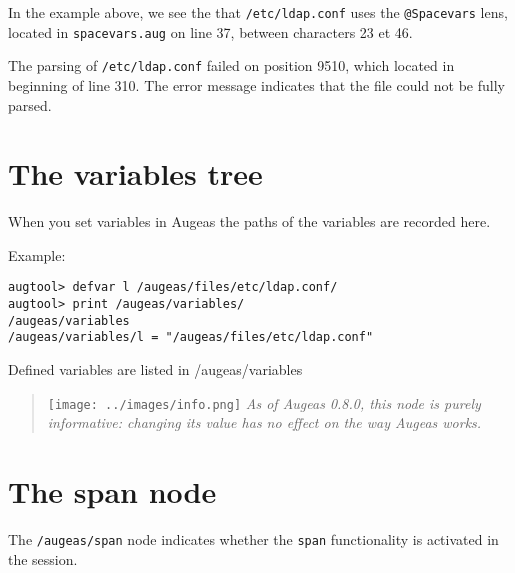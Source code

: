 In the example above, we see the that \verb!/etc/ldap.conf! uses the \verb!@Spacevars! lens, located in \verb!spacevars.aug! on line 37, between characters 23 et 46.

The parsing of \verb!/etc/ldap.conf! failed on position 9510, which located in beginning of line 310. The error message indicates that the file could not be fully parsed.


\section{The variables tree}

 

When you set variables in Augeas the paths of the variables are recorded here.

 

Example:

\begin{listing}
  \begin{verbatim}
augtool> defvar l /augeas/files/etc/ldap.conf/
augtool> print /augeas/variables/
/augeas/variables
/augeas/variables/l = "/augeas/files/etc/ldap.conf"
  \end{verbatim}
  \caption{Defined variables are listed in /augeas/variables}
  \label{lst:metadata_defvar}
\end{listing}

\begin{quote}
\texttt{[image: ../images/info.png]} \emph{As of Augeas 0.8.0, this node is purely informative: changing its value has no effect on the way Augeas works.}

\end{quote}
\section{The span node}

\label{sec:span_node}   

The \verb!/augeas/span! node indicates whether the \verb!span! functionality is activated in the session.

